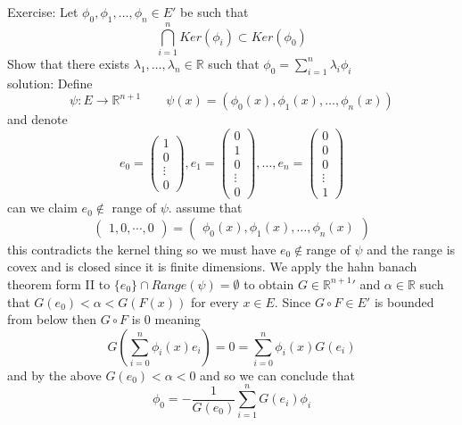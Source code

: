 \documentclass[11pt]{article}
\begin{document}
Exercise: Let  $\phi_0, \phi_1, \dots ,\phi_n \in E'$ be such that
\[
    \bigcap_{i=1}^{n} Ker(\phi_i) \subset Ker(\phi_0)
\] 
Show that there exists $\lambda_1, \dots, \lambda_n \in \mathbb{R}$ such that $\phi_0 = \sum_{i=1}^{n}\lambda_i \phi_i$ \\
solution: Define
\[
\psi : E \rightarrow \mathbb{R}^{n+1} \qquad \psi(x) = (\phi_0(x), \phi_1(x), \dots, \phi_n(x))
\] 
and denote
\[
e_0 = \begin{pmatrix} 1 \\ 0 \\ \vdots \\ 0 \end{pmatrix} , e_1 = \begin{pmatrix} 0 \\1 \\ 0 \\ \vdots \\ 0 \end{pmatrix} , \dots, e_n = \begin{pmatrix}  0 \\ 0 \\ 0 \\ \vdots \\ 1 \end{pmatrix} 
\] 
can we claim $e_0 \not\in $ range of $\psi$. assume that
\[
\begin{pmatrix} 1, 0, \cdots, 0 \end{pmatrix} = \begin{pmatrix} \phi_0(x), \phi_1(x), \dots, \phi_n(x) \end{pmatrix} 
\] 
this contradicts the kernel thing so we must have $e_0 \not\in $range of $\psi$ and the range is covex and is closed since it is finite dimensions.
We apply the hahn banach theorem form II to $\{e_0\} \cap Range(\psi) = \emptyset$ to obtain $G \in \mathbb{R}^{n+1}'$ and $\alpha \in \mathbb{R}$ such that
$G(e_0) < \alpha < G(F(x))$ for every $x \in E$. Since $G \circ F \in E'$ is bounded from below then $G \circ F$ is 0 meaning
 \[
G(\sum_{i=0}^{n}\phi_i(x)e_i) = 0 = \sum_{i=0}^{n}\phi_i(x)G(e_i)
\] 
and by the above $G(e_0) < \alpha < 0$ and so we can conclude that
\[
\phi_0 = -\frac{1}{G(e_0)} \sum_{i=1}^{n}G(e_i) \phi_i
\] 
\end{document}
